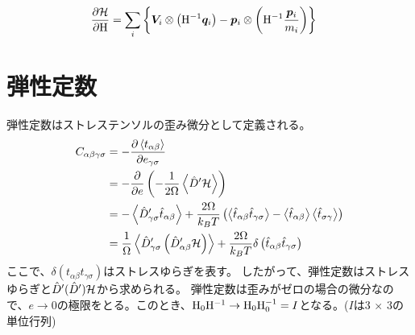 \documentclass[11pt,a4paper,uplatex]{jsarticle}
\begin{document}
\begin{align}
\frac{\partial {\cal H}}{\partial {\rm H}} &= \sum_{i} \left\{ \bm{V}_{i} \otimes \left({\rm H}^{-1} \bm{q}_{i}\right)
- \bm{p}_{i} \otimes \left( {\rm H}^{-1}\frac{\bm{p}_{i}}{m_{i}}  \right) \right\}     
\end{align}

\section{弾性定数}
弾性定数はストレステンソルの歪み微分として定義される。
\begin{align}
    C_{\alpha \beta \gamma \sigma} &= -\frac{\partial \left< t_{\alpha \beta} \right>}{\partial e_{\gamma \sigma}}\\
    &= -\frac{\partial }{\partial e} \left( - \frac{1}{2 \Omega} \left< \hat{D}' {\cal H} \right> \right) \\
    &= -\left< \hat{D}_{\gamma \sigma}' \hat{t}_{\alpha \beta} \right> + \frac{2 \Omega}{k_{B}T} \left( 
        \left< \hat{t}_{\alpha \beta} \hat{t}_{\gamma \sigma} \right>
         - \left< \hat{t}_{\alpha \beta} \right> \left< \hat{t}_{\sigma \gamma} \right>
    \right) \\
    &= \frac{1}{\Omega} \left< \hat{D}_{\gamma \sigma}' \left( \hat{D}_{\alpha \beta}' {\cal H} \right) \right> + \frac{2\Omega}{k_{B}T} \delta  \left(\hat{t}_{\alpha \beta} \hat{t}_{\gamma \sigma}\right)
\end{align}
ここで、$\delta(t_{\alpha \beta} t_{\gamma \sigma})$はストレスゆらぎを表す。
したがって、弾性定数はストレスゆらぎと$\hat{D}'(\hat{D}'){\cal H}$から求められる。
弾性定数は歪みがゼロの場合の微分なので、$e\rightarrow 0$の極限をとる。このとき、${\rm H_{0} H^{-1}} \rightarrow {\rm H_{0} H_{0}^{-1}}=I$となる。($I$は3 $\times$ 3の単位行列)
\end{document}
